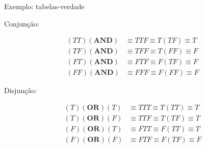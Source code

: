 \begin{frame}[fragile]{Exemplo: tabelas-verdade}

    Conjunção:

    \begin{align*}
        (TT)(\mathbf{AND}) &\equiv TTF\equiv T(TF)\equiv T\\
        (TF)(\mathbf{AND}) &\equiv TFF\equiv T(FF)\equiv F\\
        (FT)(\mathbf{AND}) &\equiv FTF\equiv F(TF)\equiv F\\
        (FF)(\mathbf{AND}) &\equiv FFF\equiv F(FF)\equiv F
    \end{align*}

    Disjunção:

    \begin{align*}
        (T)(\mathbf{OR})(T) &\equiv TTT\equiv T(TT)\equiv T\\
        (T)(\mathbf{OR})(F) &\equiv TTF\equiv T(TF)\equiv T\\
        (F)(\mathbf{OR})(T) &\equiv FTT\equiv F(TT)\equiv T\\
        (F)(\mathbf{OR})(F) &\equiv FTF\equiv F(TF)\equiv F
    \end{align*}


\end{frame}
